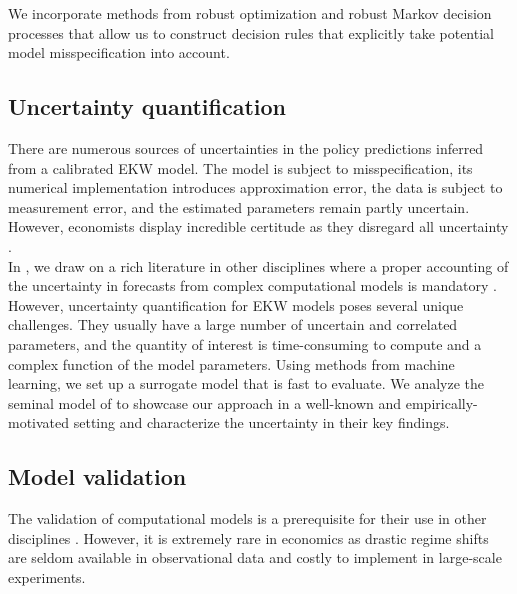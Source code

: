 \noindent We incorporate methods from robust optimization \citep{Ben-Tal.2009, Rahimian.2019, Wiesemann.2014} and robust Markov decision processes \citep{Iyengar.2005, Nilim.2005} that allow us to construct decision rules that explicitly take potential model misspecification into account.
\subsection{Uncertainty quantification}
There are numerous sources of uncertainties in the policy predictions inferred from a calibrated EKW model. The model is subject to misspecification, its numerical implementation introduces approximation error, the data is subject to measurement error, and the estimated parameters remain partly uncertain. However, economists display incredible certitude as they disregard all uncertainty \citep{Manski.2013}.\\

\noindent In \citet{Gabler.2020b}, we draw on a rich literature in other disciplines where a proper accounting of the uncertainty in forecasts from complex computational models is mandatory \citep{Saltelli.2004, Saltelli.2008, Smith.2014}. However, uncertainty quantification for EKW models poses several unique challenges. They usually have a large number of uncertain and correlated parameters, and the quantity of interest is time-consuming to compute and a complex function of the model parameters. Using methods from machine learning, we set up a surrogate model that is fast to evaluate. We analyze the seminal model of \citep{Keane.1994, Keane.1997} to showcase our approach in a well-known and empirically-motivated setting and characterize the uncertainty in their key findings.
\subsection{Model validation}
The validation of computational models is a prerequisite for their use in other disciplines \citep{Adams.2012, Oberkampf.2010}. However, it is extremely rare in economics as drastic regime shifts are seldom available in observational data and costly to implement in large-scale experiments.\\

